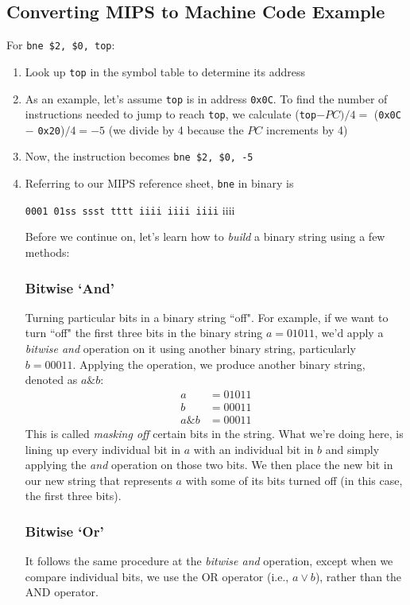 \documentclass{report}
\begin{document}
\subsection{Converting MIPS to Machine Code Example}
For \texttt{bne \$2, \$0, top}:
\begin{enumerate}
\item Look up \texttt{top} in the symbol table to determine its address
\item As an example, let's assume \texttt{top} is in address \texttt{0x0C}. To find the number of instructions needed to jump to reach \texttt{top}, we calculate (\texttt{top}$-PC) / 4 =$ (\texttt{0x0C} $-$ \texttt{0x20})$/ 4 = -5$ (we divide by 4 because the $PC$ increments by 4)
\item Now, the instruction becomes \texttt{bne \$2, \$0, -5}
\item Referring to our MIPS reference sheet, \texttt{bne} in binary is
\begin{center}
\texttt{0001 01ss ssst tttt iiii iiii iiii} iiii
\end{center}
Before we continue on, let's learn how to \textit{build} a binary string using a few methods:
\subsubsection{Bitwise `And'}
Turning particular bits in a binary string ``off". For example, if we want to turn ``off" the first three bits in the binary string $a = 01011$, we'd apply a \textit{bitwise and} operation on it using another binary string, particularly $b = 00011$. Applying the operation, we produce another binary string, denoted as $a \& b$:
\begin{align*}
a &= 0 1 0 1 1 \\
b &= 0 0 0 1 1 \\
a \& b &= 0 0 0 1 1
\end{align*}
This is called \textit{masking off} certain bits in the string. What we're doing here, is lining up every individual bit in $a$ with an individual bit in $b$ and simply applying the \textit{and} operation on those two bits. We then place the new bit in our new string that represents $a$ with some of its bits turned off (in this case, the first three bits).
\subsubsection{Bitwise `Or'}
It follows the same procedure at the \textit{bitwise and} operation, except when we compare individual bits, we use the OR operator (i.e., $a \vee b$), rather than the AND operator.

\end{enumerate}
\end{document}
